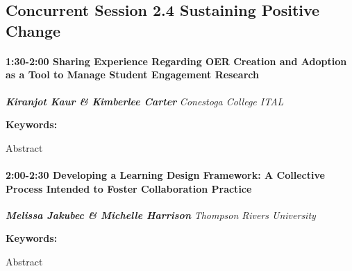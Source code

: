 \documentclass[
]{book}
\begin{document}
\hypertarget{concurrent-session-2.4-sustaining-positive-change}{%
\subsection*{Concurrent Session 2.4 \textbar{} Sustaining Positive Change}\label{concurrent-session-2.4-sustaining-positive-change}}

\begin{session}
\hypertarget{sharing-experience-regarding-oer-creation-and-adoption-as-a-tool-to-manage-student-engagement-research}{%
\paragraph*{\texorpdfstring{1:30-2:00 \textbar{} \textbf{Sharing
Experience Regarding OER Creation and Adoption as a Tool to Manage
Student Engagement} \textbar{}
Research}{1:30-2:00 \textbar{} Sharing Experience Regarding OER Creation and Adoption as a Tool to Manage Student Engagement \textbar{} Research}}\label{sharing-experience-regarding-oer-creation-and-adoption-as-a-tool-to-manage-student-engagement-research}}

\textbf{\emph{Kiranjot Kaur \& Kimberlee Carter}} \textbar{}
\emph{Conestoga College ITAL}

\textbf{Keywords:}

Abstract
\end{session}
\begin{session}
\hypertarget{developing-a-learning-design-framework-a-collective-process-intended-to-foster-collaboration-practice}{%
\paragraph*{\texorpdfstring{2:00-2:30 \textbar{} \textbf{Developing a
Learning Design Framework: A Collective Process Intended to Foster
Collaboration} \textbar{}
Practice}{2:00-2:30 \textbar{} Developing a Learning Design Framework: A Collective Process Intended to Foster Collaboration \textbar{} Practice}}\label{developing-a-learning-design-framework-a-collective-process-intended-to-foster-collaboration-practice}}

\textbf{\emph{Melissa Jakubec \& Michelle Harrison}} \textbar{}
\emph{Thompson Rivers University}

\textbf{Keywords:}

Abstract
\end{session}
\end{document}
